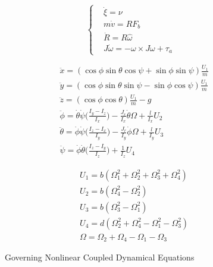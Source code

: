 \documentclass[conf]{new-aiaa}
\begin{document}
\begin{doublespace}
\begin{singlespace}
\begin{figure} 
	\begin{minipage}{0.25\textwidth}
		\begin{equation*}
			\begin{cases}
				& \dot{\xi} = \nu \\
				& m\dot{v} = RF_b \\
				& \dot{R} = R\hat{\omega} \\
				& J\dot{\omega} = -\omega \times J\omega + \tau_a
			\end{cases}
		\end{equation*}
	\end{minipage}
  \begin{minipage}{.4\textwidth}
    \begin{align*}
        &\ddot{x}=(\cos\phi\sin\theta\cos\psi + \sin\phi\sin\psi)\frac{U_1}{m} \\
		&\ddot{y}=(\cos\phi\sin\theta\sin\psi - \sin\phi\cos\psi)\frac{U_1}{m} \\
		&\ddot{z}=(\cos\phi\cos\theta)\frac{U_1}{m} -g \\
		&\ddot{\phi} = \dot{\theta}\dot{\psi}\Big(\frac{I_y - I_z}{I_x}\Big) - \frac{J_r}{I_x}\dot{\theta}\Omega + \frac{l}{I_x}U_2\\
		&\ddot{\theta} = \dot{\phi}\dot{\psi}\Big(\frac{I_z - I_x}{I_y}\Big) - \frac{J_r}{I_y}\dot{\phi}\Omega + \frac{l}{I_y}U_3 \\
		&\ddot{\psi} = \dot{\phi}\dot{\theta}\Big(\frac{I_z - I_y}{I_z}\Big) + \frac{1}{I_z}U_4
    \end{align*}
  \end{minipage}%
  \begin{minipage}{.35\textwidth}
  	\begin{align*}
  		&U_1 = b(\Omega_1^2+\Omega_2^2 + \Omega_3^2 +\Omega_4^2)\\
  		&U_2 = b(\Omega_4^2-\Omega_2^2) \\
  		&U_3 = b(\Omega_3^2-\Omega_1^2) \\ 
  		&U_4 = d(\Omega_2^2+ \Omega_4^2 - \Omega_1^2 - \Omega_3^2) \\ 
  		&\Omega = \Omega_2 + \Omega_4 - \Omega_1 - \Omega_3
  	\end{align*}
  \end{minipage}
\end{figure}
\begin{figure}
	\caption{Governing Nonlinear Coupled Dynamical Equations}
    \label{eq1}
\end{figure}
\end{singlespace}


\end{doublespace}
\end{document}
